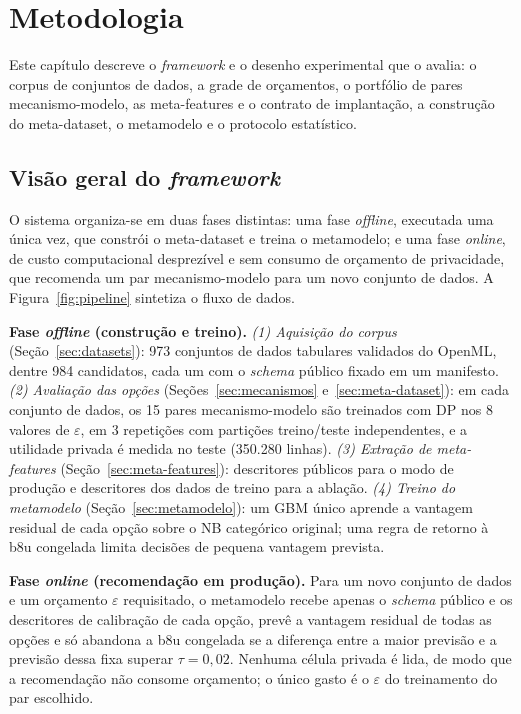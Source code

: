 \chapter{Metodologia}
\label{chap:metodologia}

Este capítulo descreve o \textit{framework} e o desenho experimental que o avalia: o corpus de conjuntos de dados, a grade de orçamentos, o portfólio de pares mecanismo-modelo, as meta-features e o contrato de implantação, a construção do meta-dataset, o metamodelo e o protocolo estatístico.

\section{Visão geral do \textit{framework}}
\label{sec:pipeline}

O sistema organiza-se em duas fases distintas: uma fase \emph{offline}, executada uma única vez, que constrói o meta-dataset e treina o metamodelo; e uma fase \emph{online}, de custo computacional desprezível e sem consumo de orçamento de privacidade, que recomenda um par mecanismo-modelo para um novo conjunto de dados. A Figura~\ref{fig:pipeline} sintetiza o fluxo de dados.

\textbf{Fase \textit{offline} (construção e treino).} \emph{(1) Aquisição do corpus} (Seção~\ref{sec:datasets}): 973 conjuntos de dados tabulares validados do OpenML, dentre 984 candidatos, cada um com o \textit{schema} público fixado em um manifesto. \emph{(2) Avaliação das opções} (Seções~\ref{sec:mecanismos} e~\ref{sec:meta-dataset}): em cada conjunto de dados, os 15 pares mecanismo-modelo são treinados com DP nos 8 valores de $\varepsilon$, em 3 repetições com partições treino/teste independentes, e a utilidade privada é medida no teste (350.280 linhas). \emph{(3) Extração de meta-features} (Seção~\ref{sec:meta-features}): descritores públicos para o modo de produção e descritores dos dados de treino para a ablação. \emph{(4) Treino do metamodelo} (Seção~\ref{sec:metamodelo}): um GBM único aprende a vantagem residual de cada opção sobre o NB categórico original; uma regra de retorno à b8u congelada limita decisões de pequena vantagem prevista.

\textbf{Fase \textit{online} (recomendação em produção).} Para um novo conjunto de dados e um orçamento $\varepsilon$ requisitado, o metamodelo recebe apenas o \textit{schema} público e os descritores de calibração de cada opção, prevê a vantagem residual de todas as opções e só abandona a b8u congelada se a diferença entre a maior previsão e a previsão dessa fixa superar $\tau=0{,}02$. Nenhuma célula privada é lida, de modo que a recomendação não consome orçamento; o único gasto é o $\varepsilon$ do treinamento do par escolhido.

